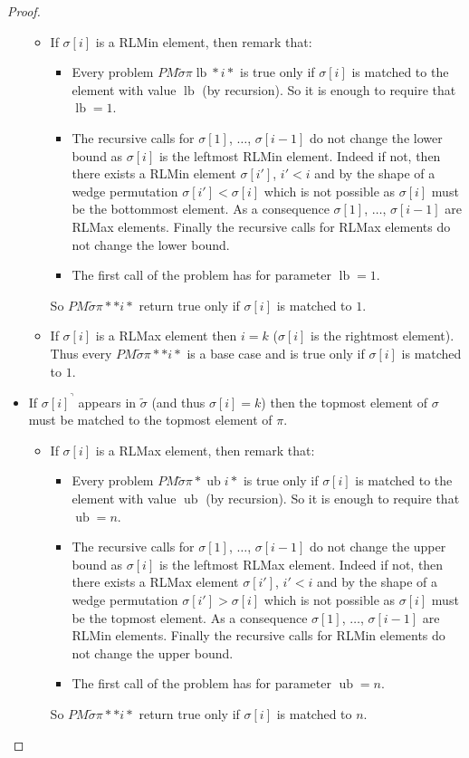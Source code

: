 \documentclass[a4paper]{llncs}
\newcommand{\ptext}{\pi}
\newcommand{\ppattern}{\sigma}
\newcommand{\PM}{PM}
\DeclareMathOperator{\lb}{lb}
\DeclareMathOperator{\ub}{ub}
\begin{document}
\begin{proof}
\begin{itemize}
\begin{itemize}
		\item If $\sigma[i]$ is a RLMin element, then remark that:
		\begin{itemize}
			\item Every problem
			$\PM{\widetilde{\sigma}}{\ptext}{\lb}{*}{i}{*}$ is true only if $\sigma[i]$ is matched to the element with value $\lb$ (by recursion).
			So it is enough to require that $\lb=1$.
			\item The recursive calls for $\sigma[1]$, $\ldots$, $\sigma[i-1]$
			do not change the lower bound as
			$\sigma[i]$ is the leftmost RLMin element. Indeed if not, then there exists a RLMin element $\sigma[i']$, $i'<i$ and by the shape of a wedge permutation $\sigma[i']<\sigma[i]$ which is not possible as $\sigma[i]$ must be the bottommost element.
			As a consequence $\sigma[1]$, $\ldots$, $\sigma[i-1]$ are RLMax elements. Finally the recursive calls for RLMax elements do not change the lower bound.
			\item The first call of the problem has for parameter $\lb=1$.
		\end{itemize}
		So $\PM{\widetilde{\sigma}}{\ptext}{*}{*}{i}{*}$ return true only if
		$\sigma[i]$ is matched to $1$.

		\item If $\sigma[i]$ is a RLMax element then $i=k$ ($\sigma[i]$ is the rightmost element). Thus every $\PM{\widetilde{\sigma}}{\ptext}{*}{*}{i}{*}$ is a base case and is true only if $\sigma[i]$ is matched to $1$.

	\end{itemize}




	\item If ${\ppattern[i]}^\urcorner$ appears in $\widetilde{\sigma}$ (and thus $\sigma[i]=k$) then the topmost element of $\ppattern$ must be matched to the topmost element of $\ptext$.
	\begin{itemize}

		\item If $\sigma[i]$ is a RLMax element, then remark that:
		\begin{itemize}
			\item Every problem
			$\PM{\widetilde{\sigma}}{\ptext}{*}{\ub}{i}{*}$ is true only if $\sigma[i]$ is matched to the element with value $\ub$ (by recursion).
			So it is enough to require that $\ub=n$.
			\item The recursive calls for $\sigma[1]$, $\ldots$, $\sigma[i-1]$
			do not change the upper bound as
			$\sigma[i]$ is the leftmost RLMax element. Indeed if not, then there exists a RLMax element $\sigma[i']$, $i'<i$ and by the shape of a wedge permutation $\sigma[i']>\sigma[i]$ which is not possible as $\sigma[i]$ must be the topmost element.
			As a consequence $\sigma[1]$, $\ldots$, $\sigma[i-1]$ are RLMin elements. Finally the recursive calls for RLMin elements do not change the upper bound.
			\item The first call of the problem has for parameter $\ub=n$.
		\end{itemize}
		So $\PM{\widetilde{\sigma}}{\ptext}{*}{*}{i}{*}$ return true only if
		$\sigma[i]$ is matched to $n$.


\end{itemize}
\end{itemize}
\end{proof}
\end{document}
